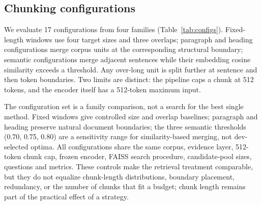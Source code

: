 \documentclass[conference]{IEEEtran}
\begin{document}
\subsection{Chunking configurations}
We evaluate 17 configurations from four families (Table~\ref{tab:configs}). Fixed-length windows use four target sizes and three overlaps; paragraph and heading configurations merge corpus units at the corresponding structural boundary; semantic configurations merge adjacent sentences while their embedding cosine similarity exceeds a threshold. Any over-long unit is split further at sentence and then token boundaries. Two limits are distinct: the pipeline caps a chunk at 512 tokens, and the encoder itself has a 512-token maximum input.

\begin{table}[t]
\centering
\caption{The 17 chunking configurations. Fixed windows contribute 12 configurations (4 sizes $\times$ 3 overlaps; all overlaps are smaller than every size).}
\label{tab:configs}
\small
{}
\end{table}

The configuration set is a family comparison, not a search for the best single method. Fixed windows give controlled size and overlap baselines; paragraph and heading preserve natural document boundaries; the three semantic thresholds (0.70, 0.75, 0.80) are a sensitivity range for similarity-based merging, not dev-selected optima. All configurations share the same corpus, evidence layer, 512-token chunk cap, frozen encoder, FAISS search procedure, candidate-pool sizes, questions and metrics. These controls make the retrieval treatment comparable, but they do not equalize chunk-length distributions, boundary placement, redundancy, or the number of chunks that fit a budget; chunk length remains part of the practical effect of a strategy.
\end{document}
